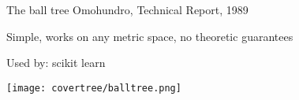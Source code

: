 \begin{frame}[fragile]{The ball tree}
Omohundro, Technical Report, 1989

\vspace{0.25cm}
Simple, works on any metric space, no theoretic guarantees

\vspace{0.25cm}
Used by: scikit learn

\vspace{0.25cm}

\texttt{[image: covertree/balltree.png]}
\end{frame}


